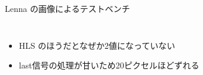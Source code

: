 \begin{frame}{Lenna の画像によるテストベンチ}
\begin{columns}[t, onlytextwidth]
\begin{column}{0.5\textwidth}
\begin{figure}
            \end{figure}
        \end{column}
    \end{columns}
    \begin{itemize}
        \item HLS のほうだとなぜか2値になっていない
        \item last信号の処理が甘いため20ピクセルほどずれる
    \end{itemize}
    
    
\end{frame}


